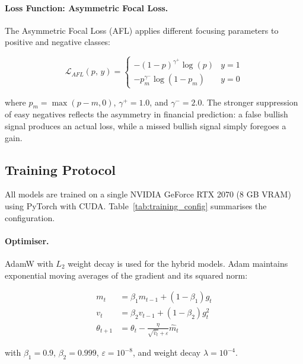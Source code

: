 \paragraph{Loss Function: Asymmetric Focal Loss.}
The Asymmetric Focal Loss (AFL) \parencite{ridnik2021} applies different focusing parameters to positive and negative classes:

\begin{equation}
\mathcal{L}_{AFL}(p,\, y) = \begin{cases}
-(1 - p)^{\gamma^+} \log(p) & y = 1 \\
-p_m^{\gamma^-} \log(1 - p_m) & y = 0
\end{cases}
\label{eq:afl}
\end{equation}

where $p_m = \max(p - m, 0)$, $\gamma^+ = 1.0$, and $\gamma^- = 2.0$. The stronger suppression of easy negatives reflects the asymmetry in financial prediction: a false bullish signal produces an actual loss, while a missed bullish signal simply foregoes a gain.

\subsection{Training Protocol}
\label{sec:training}

All models are trained on a single NVIDIA GeForce RTX 2070 (8 GB VRAM) using PyTorch with CUDA. Table~\ref{tab:training_config} summarises the configuration.

\paragraph{Optimiser.}
AdamW \parencite{kingma2015} with $L_2$ weight decay is used for the hybrid models. Adam maintains exponential moving averages of the gradient and its squared norm:

\begin{align}
m_t &= \beta_1 m_{t-1} + (1-\beta_1) g_t \\
v_t &= \beta_2 v_{t-1} + (1-\beta_2) g_t^2 \\
\theta_{t+1} &= \theta_t - \frac{\eta}{\sqrt{\hat{v}_t} + \varepsilon}\hat{m}_t
\end{align}

with $\beta_1 = 0.9$, $\beta_2 = 0.999$, $\varepsilon = 10^{-8}$, and weight decay $\lambda = 10^{-4}$.

